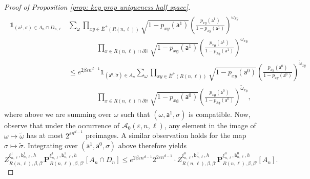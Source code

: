 \documentclass[11pt,a4paper]{article}
\numberwithin{equation}{section}
\theoremstyle{plain}
\theoremstyle{definition}
\newcommand\fg{\mathfrak{g}}
\begin{document}
\begin{proof}[Proof of Proposition \textup{\ref{prop: key prop uniqueness half space}}]
\begin{align}\label{eq:pf7}
\begin{aligned}
    \mathds{1}_{(\mathsf{a}^1,\sigma)\in A_n\cap D_{n,\ell}}&\sum_{\omega}\prod_{xy\in \overline{E}^+(R(n,\ell))} \sqrt{1-p_{xy}(\mathsf{a}^1)}\left(\frac{p_{xy}(\mathsf{a}^1)}{1-p_{xy}(\mathsf{a}^1)}\right)^{\omega_{xy}} 
    \\&\qquad\qquad\prod_{x\in R(n,\ell)\cap \partial \mathbb H} \sqrt{1-p_{x\fg}(\mathsf a^1)}\left(\frac{p_{x\fg}(\mathsf a^1)}{1-p_{x\fg}(\mathsf a^1)}\right)^{\omega_{x\fg}}
    \\&\leq e^{2\beta \varepsilon n^{d-1}}\mathds{1}_{(\mathsf{a}^0,\tilde\sigma)\in A_n}\sum_{\omega} \prod_{xy\in \overline{E}^+(R(n,\ell))}\sqrt{1-p_{xy}(\mathsf{a}^0)}\left(\frac{p_{xy}(\mathsf{a}^0)}{1-p_{xy}(\mathsf{a}^0)}\right)^{\tilde \omega_{xy}} 
    \\& \qquad\qquad\prod_{x\in R(n,\ell)\cap \partial \mathbb H} \sqrt{1-p_{x\fg}(\mathsf a^0)}\left(\frac{p_{x\fg}(\mathsf a^0)}{1-p_{x\fg}(\mathsf a^0)}\right)^{\tilde \omega_{x\fg}},
    \end{aligned}
\end{align}
where above we are summing over  $\omega$ such that $(\omega, \mathsf{a}^1,\sigma)$ is compatible. Now, observe that under the occurrence of $\mathcal{A}_0(\varepsilon,n,\ell)$, any element in the image of $\omega\mapsto \tilde
 \omega$ has at most $2^{\varepsilon n^{d-1}}$ preimages.
A similar observation holds for the map $\sigma\mapsto \tilde \sigma$.
Integrating over $(\mathsf{a}^1,\mathsf{a}^0,\sigma)$ above therefore yields
\begin{equation}\label{eq:pf8}
     Z^{\xi^1_{n,\ell},\mathsf{b}_{n,\ell}^1,h}_{R(n,\ell),\beta,\beta'}\mathbf P^{\xi^1_{n,\ell},\mathsf b^1_{n,\ell}, h}_{R(n,\ell), \beta,\beta'}[A_n\cap D_n]\leq  e^{2\beta \varepsilon n^{d-1}} 2^{2\varepsilon n^{d-1}}\cdot Z^{\xi^0_{n,\ell},\mathsf{b}_{n,\ell}^0,h}_{R(n,\ell),\beta,\beta'} \mathbf P^{\xi^0_{n,\ell},\mathsf b^0_{n,\ell}, h}_{R(n,\ell), \beta,\beta'}[A_n].
\end{equation}



\end{proof}
\end{document}
